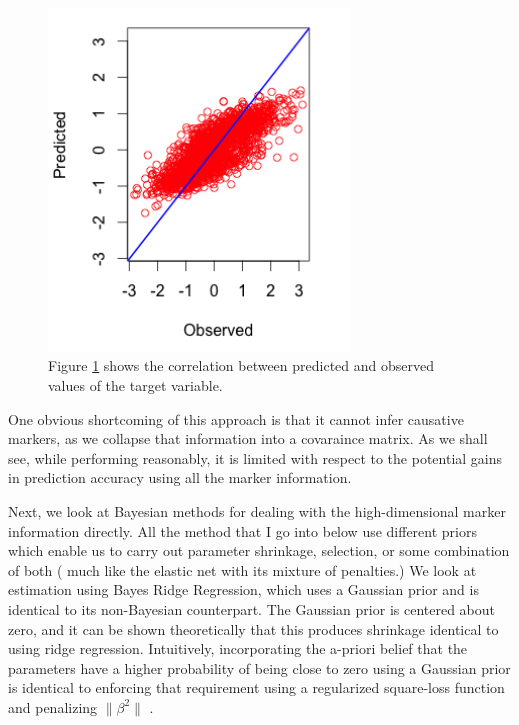 \documentclass{sig-alternate-05-2015}
\begin{document}
\begin{figure}
  \includegraphics[width=8cm]{./Images/Kernelmodel_1.png}
  \centering
  \caption{Figure \ref{fig:corrplot} shows the correlation between predicted and observed values of the target variable.}
  \label{fig:corrplot}
\end{figure}



One obvious shortcoming of this approach is that it cannot infer causative markers, as we collapse that information into a covaraince matrix. As we shall see, while performing reasonably, it is limited with respect to the potential
gains in prediction accuracy using all the marker information.

Next, we look at Bayesian methods for dealing with the high-dimensional marker information directly. All the method that I go into below use different priors which
enable us to carry out parameter shrinkage, selection, or some combination of both ( much like the elastic net with its mixture of penalties.)
We look at estimation using Bayes Ridge Regression, which uses a Gaussian prior and is identical to its non-Bayesian counterpart.
The Gaussian prior is centered about zero, and it can be shown theoretically that this produces shrinkage identical to using ridge regression.
Intuitively, incorporating the a-priori belief that the parameters have a higher
probability of being close to zero using a Gaussian prior is identical to enforcing that requirement using a regularized square-loss function and
penalizing ${ \lVert \beta^2 \rVert }$ .\cite{perez_genome-wide_2014}
\end{document}

